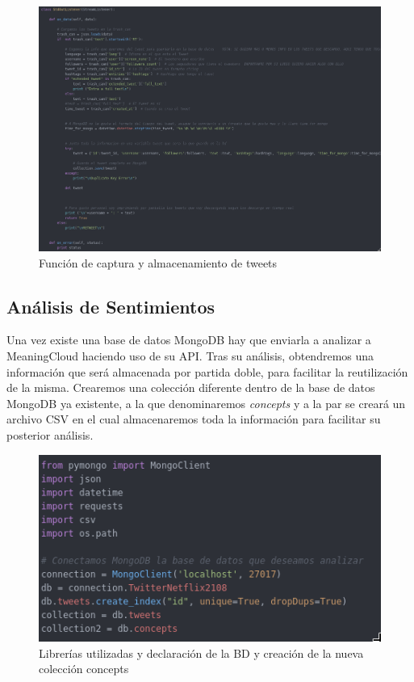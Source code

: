  
 \begin{figure}[H]
 	\centering
 	\includegraphics[scale=.35]{imagenes/codigo-ladron.png}
 	\caption{Función de captura y almacenamiento de tweets}
 	\label{fig:codigo-ladron}
 \end{figure}
















\subsection{Análisis de Sentimientos}


Una vez existe una base de datos MongoDB hay que enviarla a analizar a MeaningCloud haciendo uso de su API. Tras su análisis, obtendremos una información que será almacenada por partida doble, para facilitar la reutilización de la misma. Crearemos una colección diferente dentro de la base de datos MongoDB ya existente, a la que denominaremos \textit{concepts} y a la par se creará un archivo CSV en el cual almacenaremos toda la información para facilitar su posterior análisis. 

\begin{figure}[H]
	\centering
	\includegraphics[scale=.35]{imagenes/include-analisis.png}
	\caption{Librerías utilizadas y declaración de la BD y creación de la nueva colección concepts}
	\label{fig:libreria-analisis}
\end{figure}



